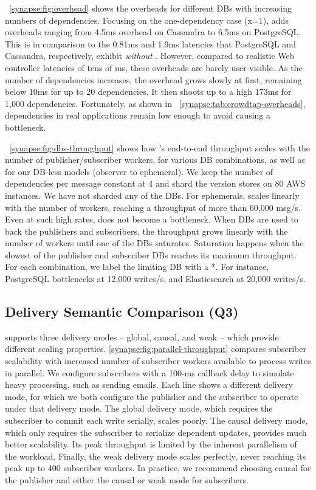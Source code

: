 \F~\ref{synapse:fig:overhead} shows the overheads for different DBs with increasing
numbers of dependencies. Focusing on the one-dependency case (x=1), \synapse
adds overheads ranging from 4.5ms overhead on Cassandra to 6.5ms on PostgreSQL.
This is in comparison to the 0.81ms and 1.9ms latencies that PostgreSQL and
Cassandra, respectively, exhibit {\em without} \synapse. However, compared to
realistic Web controller latencies of tens of ms, these overheads are barely
user-visible. As the number of dependencies increases, the overhead grows slowly
at first, remaining below 10ms for up to 20 dependencies. It then shoots up to a
high 173ms for 1,000 dependencies. Fortunately, as shown in
\F~\ref{synapse:tab:crowdtap-overheads}, dependencies in real applications remain
low enough to avoid causing a bottleneck.

\F~\ref{synapse:fig:dbs-throughput} shows how \synapse's end-to-end throughput scales
with the number of publisher/subscriber workers, for various DB
combinations, as well as for our
DB-less models (observer to ephemeral). We keep the number of dependencies per
message constant at 4 and shard the version stores on 80 AWS instances.
We have not sharded any of the DBs.
For ephemerals, \synapse scales linearly with the number of
workers, reaching a throughput of more than 60,000 msg/s. Even at such high
rates, \synapse does not become a bottleneck.  When DBs are used to
back the publishers and subscribers, the throughput grows linearly with the
number of workers until one of the DBs saturates. Saturation happens when the
slowest of the publisher and subscriber DBs reaches its maximum throughput. For each combination, we label the limiting DB with a *. For
instance, PostgreSQL bottlenecks at 12,000 writes/s, and Elasticsearch at
20,000 writes/s.


\subsection{Delivery Semantic Comparison (Q3)}
\label{synapse:sec:evaluation:delivery}

\synapse supports three delivery modes -- global, causal, and weak -- which
provide different scaling properties.
\F\ref{synapse:fig:parallel-throughput} compares subscriber scalability with 
increased number of subscriber workers available to process writes in parallel.
We configure subscribers with a 100-ms callback delay to simulate
heavy processing, such as sending emails.
Each line shows a different delivery mode, for which we both configure the
publisher and the subscriber to operate under that delivery mode.
The global delivery mode, which requires the
subscriber to commit each write serially, scales poorly.  The causal
delivery mode, which only requires the subscriber to serialize dependent
updates, provides much better scalability.  Its peak throughput is limited by
the inherent parallelism of the workload.  Finally, the weak delivery mode
scales perfectly, never reaching its peak up to 400 subscriber workers.
In practice, we recommend choosing causal for the publisher and either the
causal or weak mode for subscribers.

